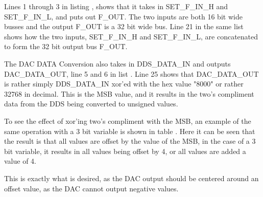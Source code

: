 

Lines 1 through 3 in listing , shows that it takes in SET\_F\_IN\_H and SET\_F\_IN\_L, and puts out F\_OUT. The two inputs are both 16 bit wide busses and the output F\_OUT is a 32 bit wide bus. Line 21 in the same list shows how the two inputs, SET\_F\_IN\_H and SET\_F\_IN\_L, are concatenated to form the 32 bit output bus F\_OUT.

The DAC DATA Conversion also takes in DDS\_DATA\_IN and outputs DAC\_DATA\_OUT, line 5 and 6 in list . Line 25 shows that DAC\_DATA\_OUT is rather simply DDS\_DATA\_IN xor'ed with the hex value "8000" or rather 32768 in decimal. This is the MSB value, and it results in the two's compliment data from the DDS being converted to unsigned values.

To see the effect of xor'ing two's compliment with the MSB, an example of the same operation with a 3 bit variable is shown in table . Here it can be seen that the result is that all values are offset by the value of the MSB, in the case of a 3 bit variable, it results in all values being offset by 4, or all values are added a value of 4. 

This is exactly what is desired, as the DAC output should be centered around an offset value, as the DAC cannot output negative values.

